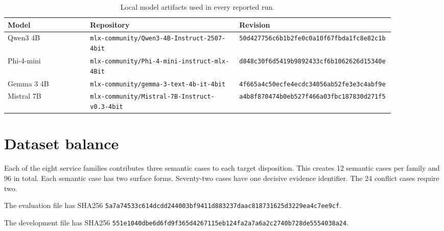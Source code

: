 \documentclass{article}
\begin{document}
\begin{table}[h]
\caption{Local model artifacts used in every reported run.}
\centering
\small
\begin{tabular}{p{0.21\linewidth}p{0.38\linewidth}p{0.29\linewidth}}
\toprule
Model & Repository & Revision \\
\midrule
Qwen3 4B & \texttt{mlx-community/}\newline\texttt{Qwen3-4B-Instruct-}\newline\texttt{2507-4bit} & \texttt{50d427756c6b1b2fe0c0}\newline\texttt{a10f67fbda1fc8e82c1b} \\
Phi-4-mini & \texttt{mlx-community/}\newline\texttt{Phi-4-mini-instruct-}\newline\texttt{mlx-4Bit} & \texttt{d848c30f6d5419b98924}\newline\texttt{33cf6b1062626d15340e} \\
Gemma 3 4B & \texttt{mlx-community/}\newline\texttt{gemma-3-text-4b-it-}\newline\texttt{4bit} & \texttt{4f665a4c50ecfe4ecdc3}\newline\texttt{4056ab52fe3e3c4abf9e} \\
Mistral 7B & \texttt{mlx-community/}\newline\texttt{Mistral-7B-Instruct-}\newline\texttt{v0.3-4bit} & \texttt{a4b8f870474b0eb527f4}\newline\texttt{66a03fbc187830d271f5} \\
\bottomrule
\end{tabular}
\end{table}

\section{Dataset balance}

Each of the eight service families contributes three semantic cases to each target disposition. This creates 12 semantic cases per family and 96 in total. Each semantic case has two surface forms. Seventy-two cases have one decisive evidence identifier. The 24 conflict cases require two.

\begin{flushleft}
The evaluation file has SHA256 \texttt{5a7a74533c614dcdd244003bf9411d88}\allowbreak\texttt{3237daac818731625d3229ea4c7ee9cf}.

The development file has SHA256 \texttt{551e1040dbe6d6fd9f365d4267115eb1}\allowbreak\texttt{24fa2a7a6a2c2740b728de5554038a24}.
\end{flushleft}
\end{document}
